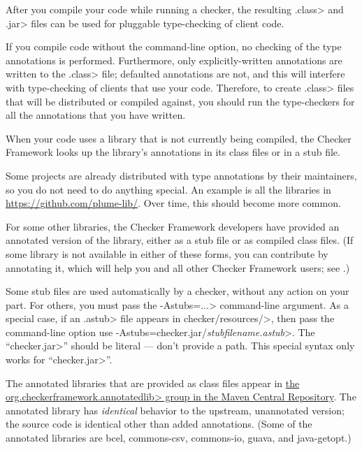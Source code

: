 After you compile your code while running a checker, the resulting
\<.class> and \<.jar> files can be used for pluggable type-checking of client code.

If you compile code without the 
command-line option, no checking of the type
annotations is performed.  Furthermore, only explicitly-written annotations
are written to the \<.class> file; defaulted annotations are not, and this
will interfere with type-checking of clients that use your code.
Therefore, to create
\<.class> files that will be distributed or compiled against, you should run the
type-checkers for all the annotations that you have written.



When your code uses a library that is not currently being compiled, the
Checker Framework looks up the library's annotations in its class files or
in a stub file.

Some projects are already distributed with type annotations by their
maintainers, so you do not need to do anything special.
An example is all the libraries in \url{https://github.com/plume-lib/}.
Over time, this should become more common.

For some other libraries, the Checker Framework developers have provided an
annotated version of the library, either as a stub file or as compiled class files.
(If some library is not available in either of these forms,
you can contribute by annotating it, which will
help you and all other Checker Framework users; see
.)

Some stub files are used automatically by a checker, without any action on
your part.  For others, you must pass the \<-Astubs=...> command-line argument.
As a special case, if an \<.astub> file appears in
\<checker/resources/>, then pass the command-line option
use \<-Astubs=checker.jar/\emph{stubfilename.astub}>.
The ``\<checker.jar>'' should be literal --- don't provide a path.
This special syntax only works for ``\<checker.jar>''.

The annotated libraries that are provided as class files appear in
\href{https://search.maven.org/search?q=org.checkerframework.annotatedlib}{the
  \<org.checkerframework.annotatedlib> group in the Maven Central Repository}.
The annotated library has \emph{identical} behavior to the upstream,
unannotated version; the source code is identical other than added
annotations.
%
(Some of the annotated libraries are
bcel,
commons-csv,
commons-io,
guava,
and
java-getopt.)

